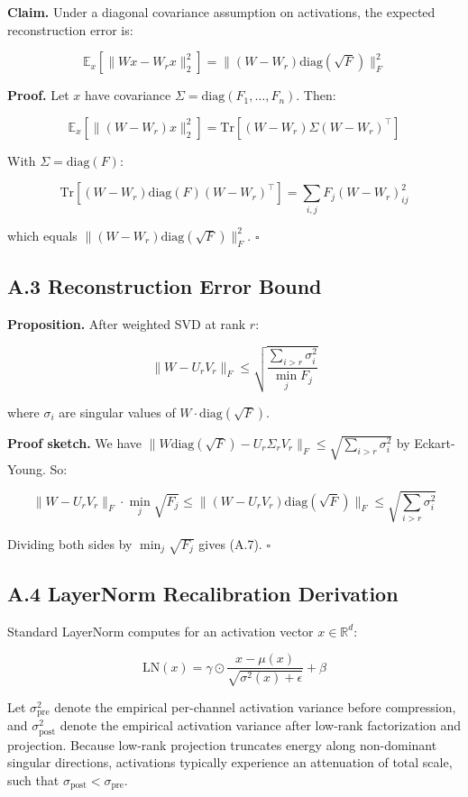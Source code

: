 \textbf{Claim.} Under a diagonal covariance assumption on activations, the 
expected reconstruction error is:

\[
\mathbb{E}_x\!\left[\|W x - W_r x\|_2^2\right] = \|(W - W_r) \mathrm{diag}(\sqrt{F})\|_F^2
\tag{A.4}
\]

\textbf{Proof.} Let $x$ have covariance $\Sigma = \mathrm{diag}(F_1, \dots, F_n)$. Then:

\[
\mathbb{E}_x[\|(W - W_r) x\|_2^2] = \mathrm{Tr}[(W - W_r) \Sigma (W - W_r)^\top]
\tag{A.5}
\]

With $\Sigma = \mathrm{diag}(F)$:

\[
\mathrm{Tr}[(W - W_r) \mathrm{diag}(F) (W - W_r)^\top] = \sum_{i, j} F_j (W - W_r)_{ij}^2
\tag{A.6}
\]

which equals $\|(W - W_r) \mathrm{diag}(\sqrt{F})\|_F^2$. $\square$

\subsection{A.3 Reconstruction Error Bound}

\textbf{Proposition.} After weighted SVD at rank $r$:

\[
\|W - U_r V_r\|_F \leq \sqrt{\frac{\sum_{i > r} \sigma_i^2}{\min_j F_j}}
\tag{A.7}
\]

where $\sigma_i$ are singular values of $W \cdot \mathrm{diag}(\sqrt{F})$.

\textbf{Proof sketch.} We have $\|W \mathrm{diag}(\sqrt{F}) - U_r \Sigma_r V_r\|_F \leq \sqrt{\sum_{i > r} \sigma_i^2}$ by Eckart-Young. So:

\[
\|W - U_r V_r\|_F \cdot \min_j \sqrt{F_j} \leq \|(W - U_r V_r) \mathrm{diag}(\sqrt{F})\|_F \leq \sqrt{\sum_{i > r} \sigma_i^2}
\tag{A.8}
\]

Dividing both sides by $\min_j \sqrt{F_j}$ gives (A.7). $\square$

\subsection{A.4 LayerNorm Recalibration Derivation}

Standard LayerNorm computes for an activation vector $x \in \mathbb{R}^d$:

\[
\mathrm{LN}(x) = \gamma \odot \frac{x - \mu(x)}{\sqrt{\sigma^2(x) + \epsilon}} + \beta
\tag{A.9}
\]

Let $\sigma_{\mathrm{pre}}^2$ denote the empirical per-channel activation variance before compression, and $\sigma_{\mathrm{post}}^2$ denote the empirical activation variance after low-rank factorization and projection. Because low-rank projection truncates energy along non-dominant singular directions, activations typically experience an attenuation of total scale, such that $\sigma_{\mathrm{post}} < \sigma_{\mathrm{pre}}$.

